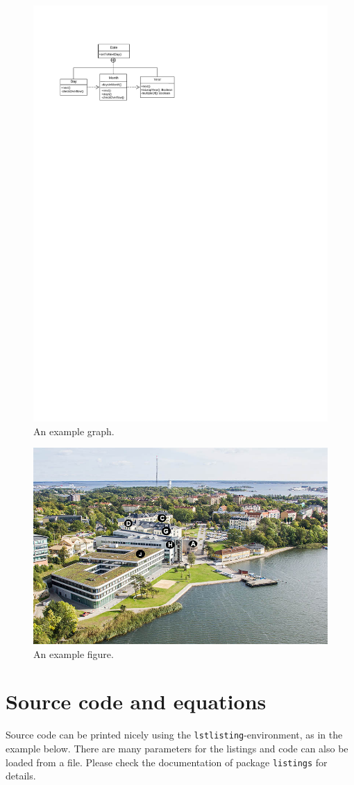 \documentclass[12pt,a4paper]{article}
\begin{document}
\begin{figure}[h!bt]
\centering
\includegraphics[width=0.6\columnwidth]{example-graph}
\caption{An example graph.}
\label{fig:uml}
\end{figure}

\begin{figure}[h!bt]
\centering
\includegraphics[width=0.6\columnwidth]{example-fig}
\caption{An example figure.}
\label{fig:bth}
\end{figure}


\section{Source code and equations}
\label{sec:code}
Source code can be printed nicely using the \texttt{lstlisting}-environment, as in the example below. There are many parameters for the listings and code can also be loaded from a file. Please check the documentation of package \texttt{listings} for details.
\end{document}
